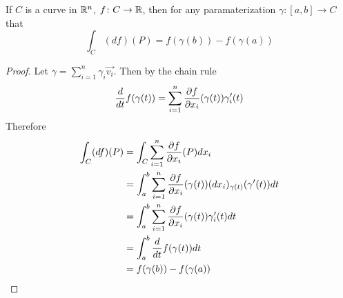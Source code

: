 \documentclass[notes.tex]{subfiles}
\begin{document}
\begin{theorem}
    If $C$ is a curve in $\mathbb{R}^n$, $f\colon C \to \mathbb{R}$, then for any paramaterization $\gamma\colon [a, b] \to C$ that
    \[
        \int_C (df)(P) = f(\gamma(b)) - f(\gamma(a))
    \]
\end{theorem}
\begin{proof}
    Let $\gamma = \sum_{i = 1}^n \gamma_i\vec{v_i}$. Then by the chain rule
    \[
        \frac{d}{dt} f(\gamma(t)) = \sum_{i = 1}^n \frac{\partial f}{\partial x_i}(\gamma(t))\gamma'_i(t)
    \]
    Therefore
    \begin{align*}
        \int_C (df)(P)
        &= \int_C \sum_{i = 1}^n \frac{\partial f}{\partial x_i}(P)dx_i \\
        &= \int_a^b \sum_{i = 1}^n \frac{\partial f}{\partial x_i}(\gamma(t))(dx_i)_{\gamma(t)}(\gamma'(t))dt \\
        &= \int_a^b \sum_{i = 1}^n \frac{\partial f}{\partial x_i}(\gamma(t)) \gamma'_i(t) dt \\
        &= \int_a^b \frac{d}{dt}f(\gamma(t))dt \\
        &= f(\gamma(b)) - f(\gamma(a))
    \end{align*}
\end{proof}
\end{document}
